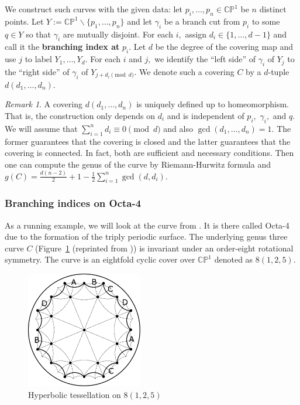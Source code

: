 \documentclass[12pt,reqno]{amsart}
\theoremstyle{definition}
\theoremstyle{remark}
\newtheorem*{remark}{Remark}
\begin{document}
We construct such curves with the given data: let $p_i, \ldots , p_n \in \mathbb{C}\mathbb{P}^1$ be $n$ distinct points. Let $Y := \mathbb{C}\mathbb{P}^1 \backslash \{p_1, \ldots, p_n\}$ and let $\gamma_i$ be a branch cut from $p_i$ to some $q \in Y$ so that $\gamma_i$ are mutually disjoint. For each $i,$ assign $d_i \in \{1, \ldots, d - 1\}$ and call it the \textbf{branching index at} $p_i.$ Let $d$ be the degree of the covering map and use $j$ to label $Y_1, \ldots , Y_d.$ For each $i$ and $j,$ we identify the ``left side'' of $\gamma_i$ of $Y_j$ to the ``right side'' of $\gamma_i$ of $Y_{j + d_i \pmod d}.$ We denote such a covering $C$ by a $d$-tuple $d (d_1, \ldots , d_n).$


\begin{remark} A covering $d (d_1, \ldots , d_n)$ is uniquely defined up to homeomorphism. That is, the construction only depends on $d_i$ and is independent of $p_i,$ $\gamma_i,$ and $q.$ We will assume that $\sum\limits_{i=1}^n d_i \equiv 0 \pmod d$ and also $\gcd (d_1, \ldots, d_n) = 1.$ The former guarantees that the covering is closed and the latter guarantees that the covering is connected. In fact, both are sufficient and necessary conditions. Then one can compute the genus of the curve by Riemann-Hurwitz formula and $g(C) = \frac{d (n-2)}{2} + 1 - \frac{1}{2} \sum\limits_{i=1}^n \gcd(d,d_i).$ 
\end{remark}

\subsubsection*{Branching indices on Octa-4}
As a running example, we will look at the curve from \cite{dami}. It is there called Octa-4 due to the formation of the triply periodic surface. The underlying genus three curve $C$ (Figure~\ref{fig:125} (reprinted from \cite{dami})) is invariant under an order-eight rotational symmetry. The curve is an eightfold cyclic cover over $\mathbb{C}\mathbb{P}^1$ denoted as $8 (1, 2, 5).$

\begin{figure}[htbp] 
   \centering
   \includegraphics[width=2in]{figures/125_base_.pdf} 
	\caption{Hyperbolic tessellation on $8(1, 2, 5)$}
	\label{fig:125}
\end{figure}
\end{document}
